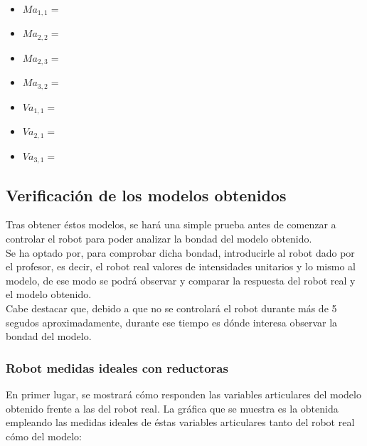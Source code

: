 \begin{itemize}
	\item $ Ma_{1,1}=$ \\ \vspace{0.2cm}
	\item $ Ma_{2,2}= $ \\ \vspace{0.2cm}
	\item $ Ma_{2,3}=$ \\ \vspace{0.2cm}
	\item $ Ma_{3,2}=  $ \\ \vspace{0.2cm}
	\item $ Va_{1,1}= $ \\ \vspace{0.2cm}
	 \item $ Va_{2,1}= $ \\ \vspace{0.2cm}
	 \item $ Va_{3,1}= $
\end{itemize}


\newpage
\subsection{Verificación de los modelos obtenidos}
Tras obtener éstos modelos, se hará una simple prueba antes de comenzar a controlar el robot para poder analizar la bondad del modelo obtenido.\\
Se ha optado por, para comprobar dicha bondad, introducirle al robot dado por el profesor, es decir, el robot real valores de intensidades unitarios y lo
mismo al modelo, de ese modo se podrá observar y comparar la respuesta del robot real y el modelo obtenido.\\

Cabe destacar que, debido a que no se controlará el robot durante más de 5 segudos aproximadamente, durante ese tiempo es dónde interesa observar la bondad del modelo.
\subsubsection{Robot medidas ideales con reductoras}
En primer lugar, se mostrará cómo responden las variables articulares del modelo obtenido frente a las del robot real. La gráfica que se muestra es la obtenida empleando las medidas ideales de éstas variables articulares tanto del robot real cómo del modelo:

